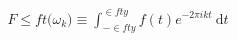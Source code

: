 \documentclass[preview]{standalone}
\begin{document}
\begin{align*}
F\le f t(\omega_{k}\big) \equiv \int_{-\in f ty}^{\in f ty}  f (t) e^{-2 \pi i k t} \mathrm{~d} t
\end{align*}
\end{document}

